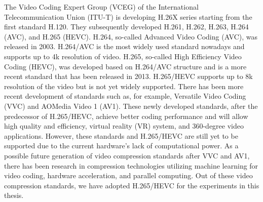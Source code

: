 The Video Coding Expert Group (VCEG) of the International Telecommunication Union (ITU-T) is developing H.26X series starting from the first standard H.120. They subsequently developed H.261, H.262, H.263, H.264 (AVC), and H.265 (HEVC). H.264, so-called Advanced Video Coding (AVC), was released in 2003. H.264/AVC is the most widely used standard nowadays and supports up to 4k resolution of video. H.265, so-called High Efficiency Video Coding (HEVC), was developed based on H.264/AVC structure and is a more recent standard that has been released in 2013. H.265/HEVC supports up to 8k resolution of the video but is not yet widely supported. There has been more recent development of standards such as, for example, Versatile Video Coding (VVC) and AOMedia Video 1 (AV1). These newly developed standards, after the predecessor of H.265/HEVC, achieve better coding performance and will allow high quality and efficiency, virtual reality (VR) system, and 360-degree video applications. However, these standards and H.265/HEVC are still yet to be supported due to the current hardware's lack of computational power. As a possible future generation of video compression standards after VVC and AV1, there has been research in compression technologies utilizing machine learning for video coding, hardware acceleration, and parallel computing. Out of these video compression standards, we have adopted H.265/HEVC for the experiments in this thesis.